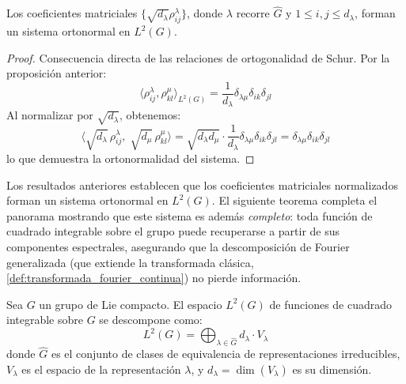 \begin{corollary}\label{cor:base_ortonormal_coeficientes}
Los coeficientes matriciales $\{\sqrt{d_\lambda} \rho^\lambda_{ij}\}$, donde $\lambda$ recorre $\widehat{G}$ y $1 \leq i,j \leq d_\lambda$, forman un sistema ortonormal en $L^2(G)$.
\end{corollary}

\begin{proof}
Consecuencia directa de las relaciones de ortogonalidad de Schur. Por la proposición anterior:
\[
\langle \rho^\lambda_{ij}, \rho^\mu_{kl} \rangle_{L^2(G)} = \frac{1}{d_\lambda} \delta_{\lambda\mu} \delta_{ik} \delta_{jl}
\]
Al normalizar por $\sqrt{d_\lambda}$, obtenemos:
\[
\langle \sqrt{d_\lambda}\, \rho^\lambda_{ij},\; \sqrt{d_\mu}\, \rho^\mu_{kl} \rangle = \sqrt{d_\lambda d_\mu} \cdot \frac{1}{d_\lambda} \delta_{\lambda\mu} \delta_{ik} \delta_{jl} = \delta_{\lambda\mu} \delta_{ik} \delta_{jl}
\]
lo que demuestra la ortonormalidad del sistema.
\end{proof}

Los resultados anteriores establecen que los coeficientes matriciales normalizados forman un sistema ortonormal en $L^2(G)$. El siguiente teorema completa el panorama mostrando que este sistema es además \textit{completo}: toda función de cuadrado integrable sobre el grupo puede recuperarse a partir de sus componentes espectrales, asegurando que la descomposición de Fourier generalizada (que extiende la transformada clásica, \autoref{def:transformada_fourier_continua}) no pierde información.

\begin{theorem}\label{thm:peter_weyl}
Sea $G$ un grupo de Lie compacto. El espacio $L^2(G)$ de funciones de cuadrado integrable sobre $G$ se descompone como:
\begin{equation}
L^2(G) = \bigoplus_{\lambda \in \widehat{G}} d_\lambda \cdot V_\lambda
\end{equation}
donde $\widehat{G}$ es el conjunto de clases de equivalencia de representaciones irreducibles, $V_\lambda$ es el espacio de la representación $\lambda$, y $d_\lambda = \dim(V_\lambda)$ es su dimensión.
\end{theorem}

